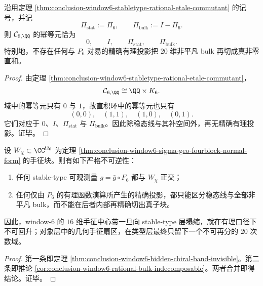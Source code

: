 \begin{corollary}\label{cor:conclusion-window6-rational-bulk-indecomposable}
沿用定理 \ref{thm:conclusion-window6-stabletype-rational-etale-commutant} 的记号，并记
\[
\Pi_{\mathrm{stat}}:=\Pi_6,
\qquad
\Pi_{\mathrm{bulk}}:=I-\Pi_6.
\]
则 \(\mathcal C_{6,\QQ}\) 的幂等元恰为
\[
0,\qquad I,\qquad \Pi_{\mathrm{stat}},\qquad \Pi_{\mathrm{bulk}}.
\]
特别地，不存在任何与 \(P_6\) 对易的精确有理投影把 \(20\) 维非平凡 bulk 再切成真非零直和。
\end{corollary}
\begin{proof}
由定理 \ref{thm:conclusion-window6-stabletype-rational-etale-commutant}，
\[
\mathcal C_{6,\QQ}\cong \QQ\times K_6.
\]
域中的幂等元只有 \(0\) 与 \(1\)，故直积环中的幂等元也只有
\[
(0,0),\quad (1,1),\quad (1,0),\quad (0,1).
\]
它们对应于 \(0\)、\(I\)、\(\Pi_{\mathrm{stat}}\) 与 \(\Pi_{\mathrm{bulk}}\)。因此除稳态线与其补空间外，再无精确有理投影。证毕。
\end{proof}

\begin{theorem}\label{thm:conclusion-window6-chiral-band-nonrecoverability}
设 \(W_\chi\subset \CC^{\Omega_6}\) 为定理 \ref{thm:conclusion-window6-sigma-geo-fourblock-normal-form} 的手征块。则有如下严格不可逆性：
\begin{enumerate}
  \item 任何 stable-type 可观测量 \(g=\bar g\circ F_6\) 都与 \(W_\chi\) 正交；
  \item 任何仅由 \(P_6\) 的有理函数演算所产生的精确投影，都只能区分稳态线与全部非平凡 bulk，而不能在后者内部再精确切出真子块。
\end{enumerate}
因此，window-\(6\) 的 \(16\) 维手征中心带一旦向 stable-type 层塌缩，就在有理口径下不可回升；对象层中的几何手征扇区，在类型层最终只留下一个不可再分的 \(20\) 次数域。
\end{theorem}
\begin{proof}
第一条即定理 \ref{thm:conclusion-window6-hidden-chiral-band-invisible}。第二条即推论 \ref{cor:conclusion-window6-rational-bulk-indecomposable}。两者合并即得结论。证毕。
\end{proof}

